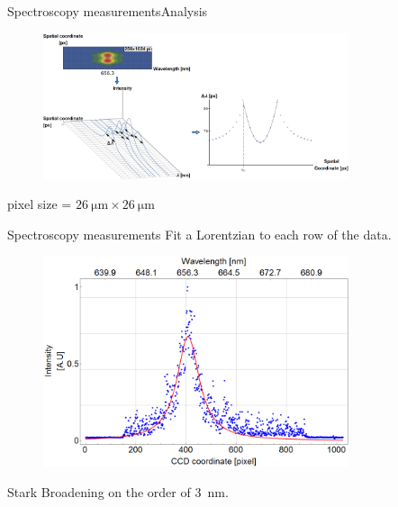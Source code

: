 \documentclass[]{beamer}
\begin{document}
  \begin{frame}{Spectroscopy measurements}{Analysis}
    \begin{figure}
      \includegraphics[width=0.8\textwidth]{figures/results/spectro/spectra_analysis.png}
    \end{figure}
    pixel size = $\SI{26}{\um} \times \SI{26}{\um}$
  \end{frame}
  \begin{frame}{Spectroscopy measurements}
    Fit a Lorentzian to each row of the data.
    \begin{figure}
      \includegraphics[width=0.8\textwidth]{figures/results/spectro/sample-lorentzian.png}
    \end{figure}
    Stark Broadening on the order of \SI{3}{\nm}.
  \end{frame}
\end{document}
